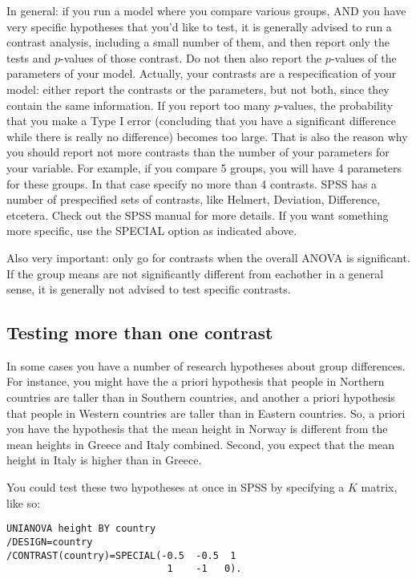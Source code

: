 In general: if you run a model where you compare various groups, AND you have very specific hypotheses that you'd like to test, it is generally advised to run a contrast analysis, including a small number of them, and then report only the tests and $p$-values of those contrast. Do not then also report the $p$-values of the parameters of your model. Actually, your contrasts are a respecification of your model: either report the contrasts or the parameters, but not both, since they contain the same information. If you report too many $p$-values, the probability that you make a Type I error (concluding that you have a significant difference while there is really no difference) becomes too large. That is also the reason why you should report not more contrasts than the number of your parameters for your variable. For example, if you compare 5 groups, you will have 4 parameters for these groups. In that case specify no more than 4 contrasts. SPSS has a number of prespecified sets of contrasts, like Helmert, Deviation, Difference, etcetera. Check out the SPSS manual for more details. If you want something more specific, use the SPECIAL option as indicated above. 

Also very important: only go for contrasts when the overall ANOVA is significant. If the group means are not significantly different from eachother in a general sense, it is generally not advised to test specific contrasts.

\subsection{Testing more than one contrast}

In some cases you have a number of research hypotheses about group differences. For instance, you might have the a priori hypothesis that people in Northern countries are taller than in Southern countries, and another a priori hypothesis that people in Western countries are taller than in Eastern countries. So, a priori you have the hypothesis that the mean height in Norway is different from the mean heights in Greece and Italy combined. Second, you expect that the mean height in Italy is higher than in Greece.

You could test these two hypotheses at once in SPSS by specifying a $K$ matrix, like so:

\begin{verbatim}
UNIANOVA height BY country
/DESIGN=country
/CONTRAST(country)=SPECIAL(-0.5  -0.5  1
                            1    -1   0).
\end{verbatim}

